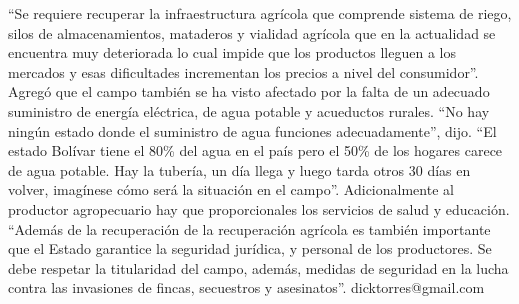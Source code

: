 \documentclass{article}%
\begin{document}
%
“Se requiere recuperar la infraestructura agrícola que comprende sistema de riego, silos de almacenamientos, mataderos y vialidad agrícola que en la actualidad se encuentra muy deteriorada lo cual impide que los productos lleguen a los mercados y esas dificultades incrementan los precios a nivel del consumidor”.%
\newline%
%
Agregó que el campo también se ha visto afectado por la falta de un adecuado suministro de energía eléctrica, de agua potable y acueductos rurales.\newline%
\newline%
“No hay ningún estado donde el suministro de agua funciones adecuadamente”, dijo.%
\newline%
%
“El estado Bolívar tiene el 80\% del agua en el país pero el 50\% de los hogares carece de agua potable. Hay la tubería, un día llega y luego tarda otros  30 días en volver, imagínese cómo será la situación en el campo”.%
\newline%
%
Adicionalmente al productor agropecuario hay que proporcionales los servicios de salud y educación.\newline%
\newline%
“Además de la recuperación de la recuperación agrícola es también importante que el Estado garantice la seguridad jurídica, y personal de los productores.%
\newline%
%
Se debe respetar la titularidad del campo, además, medidas de seguridad en la lucha contra las invasiones de fincas, secuestros y asesinatos”.%
\newline%
%
dicktorres@gmail.com%
\newline%
%
\end{document}
